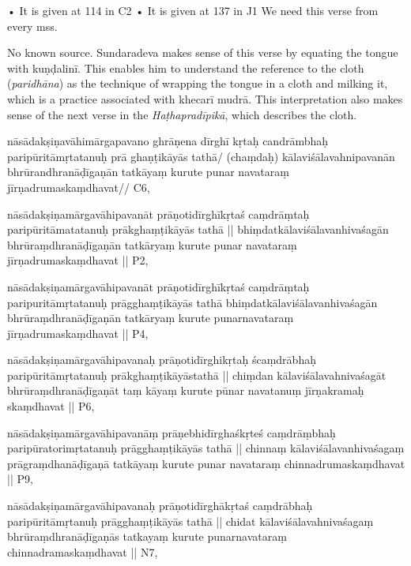 \begin{marma}[hp03_110]
  \begin{description}
    • It is given at 114 in C2
    • It is given at 137 in J1
We need this verse from every mss. 
    
    No known source. Sundaradeva makes sense of this verse by equating the tongue with kuṇḍalinī. This enables him to understand the reference to the cloth (\emph{paridhāna}) as the technique of wrapping the tongue in a cloth and milking it, which is a practice associated with khecarī mudrā. This interpretation also makes sense of the next verse in the \emph{Haṭhapradīpikā}, which describes the cloth.
  \end{description}

\end{marma}


\begin{marma}[hp03_114]


\item[nāsādakṣiṇavāhimārgapavano ghrāṇena dīrghī kṛtaḥ
candrāmbhaḥ paripūritāmṛtatanuḥ prā ghaṇṭikāyās tathā/
(chaṃdaḥ) kālaviśālavahnipavanān bhrūrandhranāḍīgaṇān
tatkāyaṃ kurute punar navataraṃ jīrṇadrumaskaṃdhavat//] C6,

\item[nāsādakṣiṇamārgavāhipavanāt prāṇotidīrghīkṛtaś 
caṃdrāṃtaḥ paripūritāmatatanuḥ prākghaṃṭikāyās tathā ||
bhiṃdatkālaviśālavanhivaśagān bhrūraṃdhranāḍīgaṇān
tatkāryaṃ kurute punar navataraṃ jīrṇadrumaskaṃdhavat ||] P2,

\item[nāsādakṣiṇamārgavāhipavanāt prāṇotidīrghīkṛtaś
caṃdrāṃtaḥ paripuritāmṛtatanuḥ prāgghaṃṭikāyās tathā
bhiṃdatkālaviśālavanhivaśagān bhrūraṃdhranāḍīgaṇān
tatkāryaṃ kurute punarnavataraṃ jīrṇadrumaskaṃdhavat ||] P4, 

\item[nāsādakṣiṇamārgavāhipavanaḥ prāṇotidīrghikṛtaḥ
ścaṃdrābhaḥ paripūritāmṛtatanuḥ prākghaṃṭikāyāstathā ||
chiṃdan kālaviśālavahnivaśagāt bhrūraṃdhranāḍīgaṇāt
taṃ kāyaṃ kurute pūnar navatanuṃ jīrṇakramaḥ skaṃdhavat ||] P6,

\item[nāsādakṣiṇamārgavāhipavanāṃ prāṇebhidīrghaśkṛteś
caṃdrāṃbhaḥ paripūratorimṛtatanuḥ prāgghaṃṭikāyās tathā ||
chinnaṃ kālaviśālavanhivaśagaṃ prāgraṃdhanāḍīgaṇā
tatkāyaṃ kurute punar navataraṃ chinnadrumaskaṃdhavat ||] P9,

\item[nāsādakṣiṇamārgavāhipavanaḥ prāṇotidīrghākṛtaś
caṃdrābhaḥ paripūritāmṛtanuḥ prāgghaṃṭikāyās tathā ||
chidat kālaviśālavahnivaśagaṃ bhrūraṃdhranāḍīgaṇās
tatkayaṃ kurute punarnavataraṃ chinnadramaskaṃdhavat ||] N7,


\end{marma}
